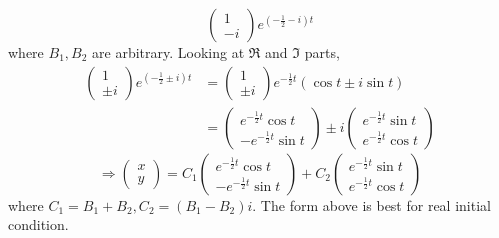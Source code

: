 \documentclass[12pt]{report}
\theoremstyle{definition}
\begin{document}
\begin{ex}
\begin{enumerate}[label = (\roman*)]
\begin{enumerate}[label = (\alph*)]
\[\begin{pmatrix}
                                    1 \\
                                    -i
                            \end{pmatrix} e^{(-\frac{1}{2}-i)t}
                        \]where $B_1, B_2$ are arbitrary. Looking at $\Re$ and $\Im$ parts,\[
                        \begin{align*}
                            \begin{pmatrix}
                                    1 \\
                                    \pm i
                                \end{pmatrix} e^{(-\frac{1}{2}\pm i)t} 
                                & = \begin{pmatrix}
                                        1 \\
                                        \pm i
                                    \end{pmatrix} e^{-\frac{1}{2}t}
                                    (\cos{t} \pm i\sin{t}) \\
                                & = \begin{pmatrix}
                                        e^{-\frac{1}{2}t}\cos{t} \\
                                        -e^{-\frac{1}{2}t}\sin{t}
                                    \end{pmatrix} \pm i\begin{pmatrix}
                                    e^{-\frac{1}{2}t}\sin{t} \\
                                    e^{-\frac{1}{2}t}\cos{t}
                                    \end{pmatrix} 
                        \end{align*}
                        \]\[
                            \Rightarrow{}\begin{pmatrix}
                                    x \\
                                    y
                            \end{pmatrix} = C_1\begin{pmatrix}
                                    e^{-\frac{1}{2}t}\cos{t} \\
                                    -e^{-\frac{1}{2}t}\sin{t}
                            \end{pmatrix} + C_2\begin{pmatrix}
                                    e^{-\frac{1}{2}t}\sin{t} \\
                                    e^{-\frac{1}{2}t}\cos{t}
                            \end{pmatrix} 
                        \]
                        where $C_1 = B_1 + B_2, C_2 = (B_1 - B_2)i$.
                        The form above is best for real initial condition.
                    

\end{enumerate}
\end{enumerate}
\end{ex}
\end{document}
